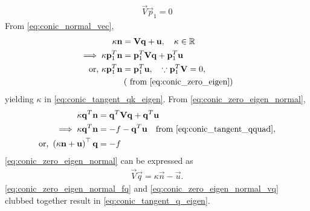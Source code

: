 \documentclass[journal,12pt,twocolumn]{IEEEtran}
\renewcommand\thesection{\arabic{section}}
\renewcommand\thesubsection{\thesection.\arabic{subsection}}
\begin{document}
\begin{enumerate}[label=\thesubsection.\arabic*.,ref=\thesubsection.\theenumi]
\begin{align}
\vec{V}\vec{p}_1 = 0
\label{eq:conic_zero_eigen}
\end{align}
From \eqref{eq:conic_normal_vec},
\begin{align}
\label{eq:conic_zero_eigen_normal}
\kappa \mathbf{n} &= \mathbf{V} \mathbf{q}+\mathbf{u}, \quad \kappa \in \mathbb{R}
\\
\implies \kappa \mathbf{p}_1^T\mathbf{n} &= \mathbf{p}_1^T\mathbf{V} \mathbf{q}+\mathbf{p}_1^T\mathbf{u}
\\
\text{or, } \kappa \mathbf{p}_1^T\mathbf{n} &= \mathbf{p}_1^T\mathbf{u},  \quad \because \mathbf{p}_1^T \mathbf{V} = 0, 
\\
	&\left(\text{ from } \eqref{eq:conic_zero_eigen}\right)
\end{align}
yielding $\kappa$ in \eqref{eq:conic_tangent_qk_eigen}. From \eqref{eq:conic_zero_eigen_normal},
\begin{align}
\kappa \mathbf{q}^T\mathbf{n} &= \mathbf{q}^T\mathbf{V} \mathbf{q}+\mathbf{q}^T\mathbf{u}
\\
\implies \kappa \mathbf{q}^T\mathbf{n} &= -f-\mathbf{q}^T\mathbf{u} \quad \text{from } \eqref{eq:conic_tangent_qquad},
\\
	\text{or, } \left(\kappa \mathbf{n}+\mathbf{u}\right)^{\top}\mathbf{q} &= -f
\label{eq:conic_zero_eigen_normal_fq}
\end{align}
\eqref{eq:conic_zero_eigen_normal} can be expressed as
\begin{align}
\label{eq:conic_zero_eigen_normal_vq}
\vec{V} \vec{q} = \kappa \vec{n} - \vec{u}.
\end{align}
\eqref{eq:conic_zero_eigen_normal_fq} and \eqref{eq:conic_zero_eigen_normal_vq} clubbed together result in \eqref{eq:conic_tangent_q_eigen}.
\end{enumerate}
\end{document}

